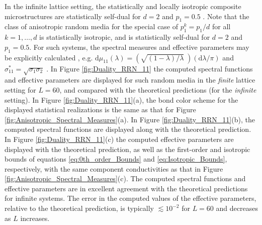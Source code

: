 \documentclass{cmslatex}
\renewcommand{\d}{\text{d}}
\begin{document}
In the infinite lattice setting, the statistically and locally
isotropic composite microstructures are statistically self-dual for
$d=2$ and $p_1=0.5$ \cite{MILTON:2002:TC}. Note that the class of
anisotropic random media for the special case of $p_1^k=p_1/d$ for all
$k=1,\ldots,d$ is statistically isotropic, and is statistically self-dual
for  $d=2$ and $p_1=0.5$. For such systems, the spectral measures and
effective parameters may be explicitly calculated
\cite{MILTON:2002:TC},
e.g. $\d\mu_{11}(\lambda)=(\sqrt{(1-\lambda)/\lambda}\;)(\d\lambda/\pi)$ and  
$\sigma^*_{11}=\sqrt{\sigma_1\sigma_2}\;$. In Figure \ref{fig:Duality_RRN_11} the 
computed spectral functions and effective parameters are displayed for
such random media in the \emph{finite} lattice setting for $L=60$, and
compared with the theoretical predictions (for the
\emph{infinite} setting). In Figure \ref{fig:Duality_RRN_11}(a), the
bond color scheme for the displayed statistical realizations is the
same as that for Figure \ref{fig:Anisotropic_Spectral_Measures}(a). In
Figure \ref{fig:Duality_RRN_11}(b), the computed spectral functions are 
displayed along with the theoretical prediction. In Figure
\ref{fig:Duality_RRN_11}(c) the computed effective parameters are
displayed with the theoretical prediction, as well as the first-order
and isotropic bounds of equations \eqref{eq:0th_order_Bounds} and
\eqref{eq:Isotropic_Bounds}, respectively, with the same component
conductivities as that in Figure
\ref{fig:Anisotropic_Spectral_Measures}(c). The computed spectral
functions and effective parameters are in excellent agreement with the
theoretical predictions for infinite systems. The error in the computed
values of the effective parameters, relative to the theoretical
prediction, is typically $\lesssim10^{-2}$ for $L=60$ and decreases 
as $L$ increases. 
\end{document}
